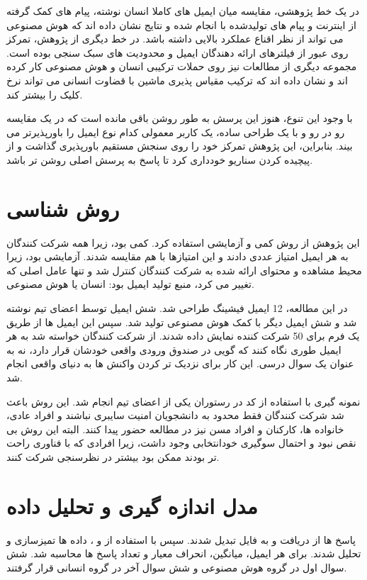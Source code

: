 \documentclass[10pt,twocolumn]{article}
\begin{document}
در یک خط پژوهشی، مقایسه میان ایمیل های کاملا انسان نوشته، پیام های کمک گرفته از اینترنت و پیام های تولیدشده با  انجام شده و نتایج نشان داده اند که هوش مصنوعی می تواند از نظر اقناع عملکرد بالایی داشته باشد. در خط دیگری از پژوهش، تمرکز روی عبور از فیلترهای ارائه دهندگان ایمیل و محدودیت های سبک سنجی بوده است. مجموعه دیگری از مطالعات نیز روی حملات ترکیبی انسان و هوش مصنوعی کار کرده اند و نشان داده اند که ترکیب مقیاس پذیری ماشین با قضاوت انسانی می تواند نرخ کلیک را بیشتر کند.

با وجود این تنوع، هنوز این پرسش به طور روشن باقی مانده است که در یک مقایسه رو در رو و با یک طراحی ساده، یک کاربر معمولی کدام نوع ایمیل را باورپذیرتر می بیند. بنابراین، این پژوهش تمرکز خود را روی سنجش مستقیم باورپذیری گذاشت و از پیچیده کردن سناریو خودداری کرد تا پاسخ به پرسش اصلی روشن تر باشد.

\section{روش شناسی}
این پژوهش از روش کمی و آزمایشی استفاده کرد. کمی بود، زیرا همه شرکت کنندگان به هر ایمیل امتیاز عددی دادند و این امتیازها با هم مقایسه شدند. آزمایشی بود، زیرا محیط مشاهده و محتوای ارائه شده به شرکت کنندگان کنترل شد و تنها عامل اصلی که تغییر می کرد، منبع تولید ایمیل بود: انسان یا هوش مصنوعی.

در این مطالعه، 12 ایمیل فیشینگ طراحی شد. شش ایمیل توسط اعضای تیم نوشته شد و شش ایمیل دیگر با کمک هوش مصنوعی تولید شد. سپس این ایمیل ها از طریق یک فرم برای 50 شرکت کننده نمایش داده شدند. از شرکت کنندگان خواسته شد به هر ایمیل طوری نگاه کنند که گویی در صندوق ورودی واقعی خودشان قرار دارد، نه به عنوان یک سوال درسی. این کار برای نزدیک تر کردن واکنش ها به دنیای واقعی انجام شد.

نمونه گیری با استفاده از کد  در رستوران یکی از اعضای تیم انجام شد. این روش باعث شد شرکت کنندگان فقط محدود به دانشجویان امنیت سایبری نباشند و افراد عادی، خانواده ها، کارکنان و افراد مسن نیز در مطالعه حضور پیدا کنند. البته این روش بی نقص نبود و احتمال سوگیری خودانتخابی وجود داشت، زیرا افرادی که با فناوری راحت تر بودند ممکن بود بیشتر در نظرسنجی شرکت کنند.

\section{مدل اندازه گیری و تحلیل داده}
پاسخ ها از  دریافت و به فایل  تبدیل شدند. سپس با استفاده از  و ، داده ها تمیزسازی و تحلیل شدند. برای هر ایمیل، میانگین، انحراف معیار و تعداد پاسخ ها محاسبه شد. شش سوال اول در گروه هوش مصنوعی و شش سوال آخر در گروه انسانی قرار گرفتند.
\end{document}

